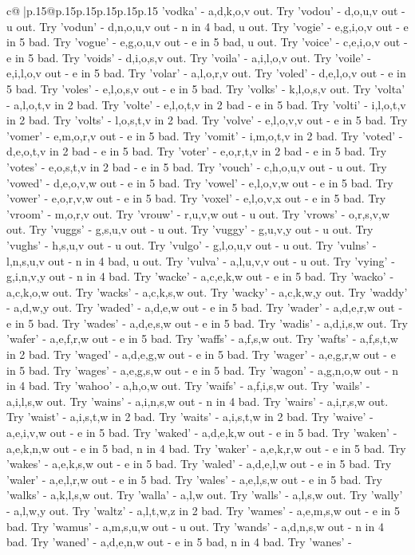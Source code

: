 \documentclass{article}
\begin{document}
{\begin{supertabular}{c@{$\;$}|p{.15\linewidth}@{}p{.15\linewidth}p{.15\linewidth}p{.15\linewidth}p{.15\linewidth}p{.15\linewidth}}
{{{'vodka' {-} a,d,k,o,v out. Try 'vodou' {-} d,o,u,v out {-} u out. Try 'vodun' {-} d,n,o,u,v out {-} n in 4 bad, u out. Try 'vogie' {-} e,g,i,o,v out {-} e in 5 bad. Try 'vogue' {-} e,g,o,u,v out {-} e in 5 bad, u out. Try 'voice' {-} c,e,i,o,v out {-} e in 5 bad. Try 'voids' {-} d,i,o,s,v out. Try 'voila' {-} a,i,l,o,v out. Try 'voile' {-} e,i,l,o,v out {-} e in 5 bad. Try 'volar' {-} a,l,o,r,v out. Try 'voled' {-} d,e,l,o,v out {-} e in 5 bad. Try 'voles' {-} e,l,o,s,v out {-} e in 5 bad. Try 'volks' {-} k,l,o,s,v out. Try 'volta' {-} a,l,o,t,v in 2 bad. Try 'volte' {-} e,l,o,t,v in 2 bad {-} e in 5 bad. Try 'volti' {-} i,l,o,t,v in 2 bad. Try 'volts' {-} l,o,s,t,v in 2 bad. Try 'volve' {-} e,l,o,v,v out {-} e in 5 bad. Try 'vomer' {-} e,m,o,r,v out {-} e in 5 bad. Try 'vomit' {-} i,m,o,t,v in 2 bad. Try 'voted' {-} d,e,o,t,v in 2 bad {-} e in 5 bad. Try 'voter' {-} e,o,r,t,v in 2 bad {-} e in 5 bad. Try 'votes' {-} e,o,s,t,v in 2 bad {-} e in 5 bad. Try 'vouch' {-} c,h,o,u,v out {-} u out. Try 'vowed' {-} d,e,o,v,w out {-} e in 5 bad. Try 'vowel' {-} e,l,o,v,w out {-} e in 5 bad. Try 'vower' {-} e,o,r,v,w out {-} e in 5 bad. Try 'voxel' {-} e,l,o,v,x out {-} e in 5 bad. Try 'vroom' {-} m,o,r,v out. Try 'vrouw' {-} r,u,v,w out {-} u out. Try 'vrows' {-} o,r,s,v,w out. Try 'vuggs' {-} g,s,u,v out {-} u out. Try 'vuggy' {-} g,u,v,y out {-} u out. Try 'vughs' {-} h,s,u,v out {-} u out. Try 'vulgo' {-} g,l,o,u,v out {-} u out. Try 'vulns' {-} l,n,s,u,v out {-} n in 4 bad, u out. Try 'vulva' {-} a,l,u,v,v out {-} u out. Try 'vying' {-} g,i,n,v,y out {-} n in 4 bad. Try 'wacke' {-} a,c,e,k,w out {-} e in 5 bad. Try 'wacko' {-} a,c,k,o,w out. Try 'wacks' {-} a,c,k,s,w out. Try 'wacky' {-} a,c,k,w,y out. Try 'waddy' {-} a,d,w,y out. Try 'waded' {-} a,d,e,w out {-} e in 5 bad. Try 'wader' {-} a,d,e,r,w out {-} e in 5 bad. Try 'wades' {-} a,d,e,s,w out {-} e in 5 bad. Try 'wadis' {-} a,d,i,s,w out. Try 'wafer' {-} a,e,f,r,w out {-} e in 5 bad. Try 'waffs' {-} a,f,s,w out. Try 'wafts' {-} a,f,s,t,w in 2 bad. Try 'waged' {-} a,d,e,g,w out {-} e in 5 bad. Try 'wager' {-} a,e,g,r,w out {-} e in 5 bad. Try 'wages' {-} a,e,g,s,w out {-} e in 5 bad. Try 'wagon' {-} a,g,n,o,w out {-} n in 4 bad. Try 'wahoo' {-} a,h,o,w out. Try 'waifs' {-} a,f,i,s,w out. Try 'wails' {-} a,i,l,s,w out. Try 'wains' {-} a,i,n,s,w out {-} n in 4 bad. Try 'wairs' {-} a,i,r,s,w out. Try 'waist' {-} a,i,s,t,w in 2 bad. Try 'waits' {-} a,i,s,t,w in 2 bad. Try 'waive' {-} a,e,i,v,w out {-} e in 5 bad. Try 'waked' {-} a,d,e,k,w out {-} e in 5 bad. Try 'waken' {-} a,e,k,n,w out {-} e in 5 bad, n in 4 bad. Try 'waker' {-} a,e,k,r,w out {-} e in 5 bad. Try 'wakes' {-} a,e,k,s,w out {-} e in 5 bad. Try 'waled' {-} a,d,e,l,w out {-} e in 5 bad. Try 'waler' {-} a,e,l,r,w out {-} e in 5 bad. Try 'wales' {-} a,e,l,s,w out {-} e in 5 bad. Try 'walks' {-} a,k,l,s,w out. Try 'walla' {-} a,l,w out. Try 'walls' {-} a,l,s,w out. Try 'wally' {-} a,l,w,y out. Try 'waltz' {-} a,l,t,w,z in 2 bad. Try 'wames' {-} a,e,m,s,w out {-} e in 5 bad. Try 'wamus' {-} a,m,s,u,w out {-} u out. Try 'wands' {-} a,d,n,s,w out {-} n in 4 bad. Try 'waned' {-} a,d,e,n,w out {-} e in 5 bad, n in 4 bad. Try 'wanes' {-} }}}
\end{supertabular}}
\end{document}
